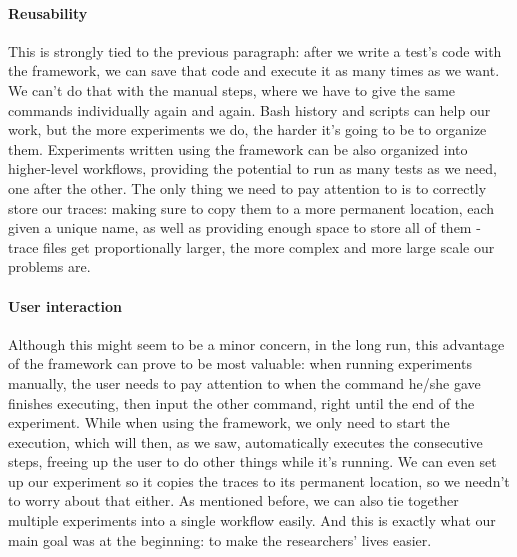 \paragraph{Reusability}
This is strongly tied to the previous paragraph: after we write a
test's code with the framework, we can save that code and execute it
as many times as we want. We can't do that with the manual steps,
where we have to give the same commands individually again and
again. Bash history and scripts can help our work, but the more
experiments we do, the harder it's going to be to organize
them. Experiments written using the framework can be also organized
into higher-level workflows, providing the potential to run as many
tests as we need, one after the other. The only thing we need to pay
attention to is to correctly store our traces: making sure to copy
them to a more permanent location, each given a unique name, as well
as providing enough space to store all of them - trace files get
proportionally larger, the more complex and more large scale our
problems are.
\paragraph{User interaction}
Although this might seem to be a minor concern, in the long run, this
advantage of the framework can prove to be most valuable: when running
experiments manually, the user needs to pay attention to when the
command he/she gave finishes executing, then input the other command,
right until the end of the experiment. While when using the framework,
we only need to start the execution, which will then, as we saw,
automatically executes the consecutive steps, freeing up the user to
do other things while it's running. We can even set up our experiment
so it copies the traces to its permanent location, so we needn't to
worry about that either. As mentioned before, we can also tie together
multiple experiments into a single workflow easily. And this is
exactly what our main goal was at the beginning: to make the
researchers' lives easier.
